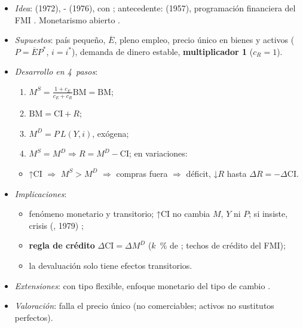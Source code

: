 \documentclass{article}
\begin{document}
\begin{columnas}
\begin{itemize}
\item \emph{Idea}:  (1972), - (1976), con ; antecedente:  (1957), programación financiera del FMI . Monetarismo abierto .
\item \emph{Supuestos}: país pequeño, $\overline E$, pleno empleo, precio único en bienes y activos ($P=\overline EP^*$, $i=i^*$), demanda de dinero estable, \textbf{multiplicador 1} ($c_R=1$).
\item \emph{Desarrollo en 4~pasos}:
  \begin{enumerate}
  \item $M^S=\frac{1+c_E}{c_E+c_R}\mathrm{BM}=\mathrm{BM}$;
  \item $\mathrm{BM}=\mathrm{CI}+R$;
  \item $M^D=P\,L(Y,i)$, exógena;
  \item $M^S=M^D\Rightarrow R=M^D-\mathrm{CI}$; en variaciones:
  \end{enumerate}
  \begin{itemize}
  \item ↑CI $\Rightarrow$ $M^S>M^D$ $\Rightarrow$ compras fuera $\Rightarrow$ déficit, ↓$R$ hasta $\Delta R=-\Delta\mathrm{CI}$.
  \end{itemize}
\item \emph{Implicaciones}:
  \begin{itemize}
  \item fenómeno monetario y transitorio; ↑CI no cambia $M$, $Y$ ni $P$; si insiste, crisis (, 1979) ;
  \item \textbf{regla de crédito} $\Delta\mathrm{CI}=\Delta M^D$ ($k$~\% de ; techos de crédito del FMI);
  \item la devaluación solo tiene efectos transitorios.
  \end{itemize}
\item \emph{Extensiones}: con tipo flexible, enfoque monetario del tipo de cambio .
\item \emph{Valoración}: falla el precio único (no comerciables; activos no sustitutos perfectos).
\end{itemize}


\end{columnas}
\end{document}
